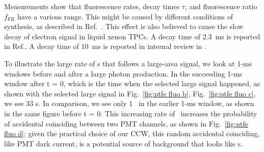 Measurements show that fluorescence rates, decay times $\tau$, and fluorescence ratio $f_{\text{FR}}$ have a various range. This might be caused by different conditions of synthesis, as described in Ref.~\cite{Gachkovskii1969}. This effect is also believed to cause the slow decay of electron signal in liquid xenon TPCs. A decay time of \SI{2.3}{\ms} is reported in Ref.\cite{Sorensen2018}. A decay time of \SI{10}{\ms} is reported in internal review in \luxe .  

To illustrate the large rate of \sphe s that follows a large-area signal, we look at 1-\si{\ms} windows before and after a large photon production. In the succeeding 1-\si{\ms} window after t = \num{0}, which is the time when the selected large signal happened, as shown with the selected large signal in Fig.~\ref{fig:ptfe fluo b}, Fig.~\ref{fig:ptfe fluo c}, we see 33 \sphe s. In comparison, we see only 1 \sphe\ in the earlier 1-\si{\ms} window, as shown in the same figure before t = \num{0}. 
This increasing rate of \sphe\ increases the probability of accidental coinciding between two PMT channels, as shown in Fig.~\ref{fig:ptfe fluo d}; given the practical choice of our CCW, this random accidental coinciding, like PMT dark current, is a potential source of background that looks like \ees s.


